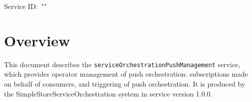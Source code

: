 \documentclass[a4paper]{arrowhead}
\begin{document}
\sloppy

\ArrowheadSetup

\begin{center}
  \vspace*{1cm}
  \huge{\arrowtitle}

  \vspace*{0.2cm}
  \LARGE{\arrowtype}
  \vspace*{1cm}

  \Large{Service ID: \textit{"\arrowid"}}

  \vspace*{\fill}


  \vspace*{1cm}
  \vspace*{\fill}

  \begin{abstract}
    This document describes the \texttt{service\allowbreak{}Orchestration\allowbreak{}Push\allowbreak{}Management} service, version 1.0.0, produced by the SimpleStoreServiceOrchestration core system of Arrowhead 5.2.2.
  \end{abstract}

  \vspace*{1cm}
\end{center}

\newpage

\tableofcontents
\newpage

\section{Overview}
\label{sec:overview}

This document describes the \texttt{service\allowbreak{}Orchestration\allowbreak{}Push\allowbreak{}Management} service, which provides operator management of push orchestration: subscriptions made on behalf of consumers, and triggering of push orchestration.
It is produced by the SimpleStoreServiceOrchestration system \cite{ssso-sysd} in service version 1.0.0.
\end{document}
